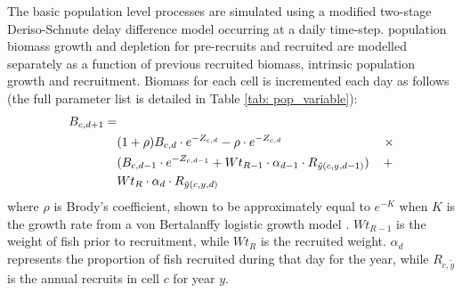 \documentclass[review]{elsarticle}
\begin{document}
The basic population level processes are simulated using a modified two-stage
Deriso-Schnute delay difference model \citep{Deriso1980, Schnute1985,
	Dichmont2003} occurring at a daily time-step. 
 population
biomass growth and depletion for pre-recruits and 
recruited   are modelled
separately as a function of previous recruited biomass, intrinsic population
growth and recruitment. Biomass for each cell is incremented each day as
follows (the full parameter list is detailed in Table \ref{tab: pop_variable}):
\begin{equation}
	\begin{split}
	B_{c,d+1} = &\\
	& (1 + \rho) B_{c,d} \cdot e^{-Z_{c,d}} - \rho \cdot e^{-Z_{c,d}} \hspace{2.9cm}
	\times \\  
	& (B_{c,d-1} \cdot e^{-Z_{c,d-1}} + Wt_{R-1} \cdot \alpha_{d-1} \cdot
	R_{\tilde{y}(c,y,d-1)})
	\hspace{0.4cm} + \\
	& Wt_{R} \cdot \alpha_{d} \cdot R_{\tilde{y}(c,y,d)} 
	\end{split}
\end{equation}
where $\rho$ is Brody's coefficient, shown to be approximately equal to
$e^{-K}$ when $K$ is the growth rate from a von Bertalanffy logistic growth
model \citep{Schnute1985}. $Wt_{R-1}$ is the weight of fish prior to
recruitment, while $Wt_{R}$ is the recruited weight. $\alpha_{d}$ represents
the proportion of fish recruited during that day for the year, while
$R_{c,\tilde{y}}$ is the annual recruits in cell $c$ for year $y$. \\
\end{document}
